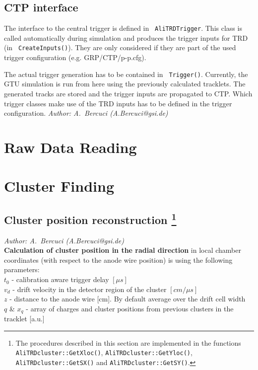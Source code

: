 \documentclass{alicetdr}
\begin{document}
\subsection{CTP interface}

The interface to the central trigger is defined in {\tt
  AliTRDTrigger}. This class is called automatically during simulation
and produces the trigger inputs for TRD (in {\tt
  CreateInputs()}). They are only considered if they are part of the
used trigger configuration (e.g. GRP/CTP/p-p.cfg).

The actual trigger generation has to be contained in {\tt
  Trigger()}. Currently, the GTU simulation is run from here using the
previously calculated tracklets. The generated tracks are stored and
the trigger inputs are propagated to CTP. Which trigger classes make
use of the TRD inputs has to be defined in the trigger configuration. 
%
\newpage
\setcounter{chapter}{2}
\setcounter{section}{0}    
\label{REC:}
{\it Author: A.~Bercuci (A.Bercuci@gsi.de)}
\thispagestyle{empty}
%
\section{Raw Data Reading}
%
\section{Cluster Finding}\label{REC:CL:}
%
\subsection[Cluster position reconstruction]{Cluster position reconstruction
\footnote{The procedures described in this section are implemented in the functions 
{\tt AliTRDcluster::GetXloc()}, {\tt AliTRDcluster::GetYloc()},
{\tt AliTRDcluster::GetSX()} and {\tt AliTRDcluster::GetSY()}.}}\label{REC:CL:rphi}
{\it Author: A.~Bercuci (A.Bercuci@gsi.de)}
\\
{\bf Calculation of cluster position in the radial direction} in local chamber 
coordinates (with respect to the anode wire position) is using the following 
parameters:\\
  $t_0$ - calibration aware trigger delay $[\mu s]$\\
  $v_d$ - drift velocity in the detector region of the cluster $[cm/\mu s]$\\
  $z$ - distance to the anode wire [cm]. By default average over the drift cell width\\
  $q$ \& $x_q$ - array of charges and cluster positions from previous clusters in the tracklet [a.u.]
\end{document}
